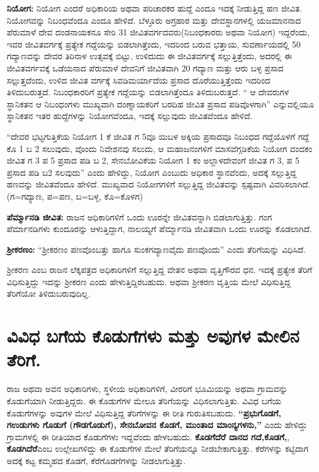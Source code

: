 \textbf{ನಿಯೋಗ: } ನಿಯೋಗ ಎಂದರೆ ಅಧಿಕಾರಿಯ ಅಥವಾ ಪರಿಚಾರಕರ ಹುದ್ದೆ ಎಂದೂ ಇದಕ್ಕೆ ನೀಡುತ್ತಿದ್ದ ಹಣ ಜೀವಿತ. ನಿಯೋಗವನ್ನು ನಿಬಂಧವೆಂದೂ ಎಂದೂ ಹೇಳಿದೆ. ಬೆಳ್ಳೂರು ಅಗ್ರಹಾರ ಮತ್ತು ದೇವಸ್ಥಾನಗಳಲ್ಲಿ ಯಜಮಾನನಾದ ಪೆರುಮಾಳೆ ದೇವ ದಂಡನಾಯಕನೂ ಸೇರಿ 31 ಜೀವಿತವರ್ಗದವರು(ನಿಬಂಧಕಾರರು ಅಥವಾ ನಿಯೋಗ) ಇದ್ದರೆಂದು, ಇವರ ಜೀವಿತವರ್ಗಕ್ಕೆ ಪ್ರತ್ಯೇಕ ಗದ್ದೆಯನ್ನು ಬಿಡಲಾಗಿತ್ತೆಂದು, ಇದರಿಂದ ಬರುವ ಭತ್ತಾಯ, ಸುವರ್ಣಾಯದಲ್ಲಿ 50 ಗದ್ಯಾಣವನ್ನು ದೇವರ ತಿರಿನಾಳ ಉತ್ಸವಕ್ಕೆ ಬಿಟ್ಟು, ಉಳಿದುದು ಈ ಜೀವಿತವರ್ಗಕ್ಕೆ ಸಲ್ಲುತ್ತಿತ್ತೆಂದು, ಅದರಲ್ಲಿ ಈ ಜೀವಿತವರ್ಗವಕ್ಕೆ ಒಡೆಯನಾದ ಪೆರುಮಾಳೆ ದೇವನಿಗೆ ಜೀವಿತವಾಗಿ 20 ಗದ್ಯಾಣ ಮತ್ತು ಆರು ಬಳ್ಳ ಪ್ರಸಾದ ಸಲ್ಲುತ್ತದೆಂದು, ಉಳಿದ ಜೀವಿತ ವರ್ಗಕ್ಕೆ ಸಿವಡಿಮರ್ಯಾದೆಯ ಪ್ರಸಾದ ದೊರೆಯುತ್ತಿತ್ತೆಂದು ಇದರಿಂದ ತಿಳಿದುಬರುತ್ತದೆ. ನಿಬಂಧಕಾರರಿಗೆ ಪ್ರತ್ಯೇಕ ಗದ್ದೆಯನ್ನು ಬಿಡಲಾಗಿತ್ತೆಂದೂ ತಿಳಿದುಬರುತ್ತದೆ. “ ಆ ದೇವರುಗಳ ಸ್ಥಾನಿಕತನ ಆ ನಿಬಂಧಂಗಳು ಮುಖ್ಯವಾಗಿ ದಂಣ್ನಾಯಕರಿಗೆ ಬರದಿಹ ಜೀವಿತ ಪ್ರಸಾದ ಪಡಿವೊಳಗಾಗಿ” ಎನ್ನುವಲ್ಲಿಯೂ ಸ್ಥಾನಿಕತನ ಇತರ ಹುದ್ದೆಗಳನ್ನು ನಿಯೋಗವೆಂದೂ, ಇದಕ್ಕೆ ಸಲ್ಲುವುದು ಜೀವಿತವೆಂದೂ ಹೇಳಿದೆ.

“ದೇವರ ಭಟ್ಟಗುತ್ತಿಕೆಯ ನಿಯೋಗ 1 ಕೆ ಜೀವಿತ ಗ 5ವೂ ಯಿಬಳ ಅಕ್ಕಿಯ ಪ್ರಸಾದವೂ ನಿಬಂಧದ ಗದ್ದೆಯೊಳಗೆ ಗದ್ದೆ ಕೊ 1 ಬ 2 ಸಲುವುದು, ವೊಂದು ನಿವೇಶನವು ಸಲುದು, ಆ ಮಹಾಜನಂಗಳಿಗೆ ಮಾಸವೆಗ್ಗಡಿಕೆಯ ನಿಯೋಗ ವಂದಕಂ ಜೀವಿತ ಗ 3 ಪ 5 ಪ್ರಸಾದ ಪಡಿ ಬ 2, ಸೇನಬೋವಿಕೆಯ ನಿಯೋಗ 1 ಕಂ ಅಲ್ಲಾಳದೇವಂಗೆ ಜೀವಿತ ಗ 3, ಪ 5 ಪ್ರಸಾದ ಪಡಿ ಬ2 ಸಲವುದು” ಎಂದು ಹೇಳಿದ್ದು, ನಿಯೋಗ ಎಂಬುದು ಅಧಿಕಾರ ಸ್ಥಾನವೆಂದು, ಅದಕ್ಕೆ ಸಲ್ಲುತ್ತಿದ್ದ ಹಣವನ್ನು ಜೀವಿತವೆಂದೂ ಹೇಳಿದೆ. ಮುಖ್ಯವಾದ ನಿಯೋಗಗಳಿಗೆ ಸಲ್ಲುತ್ತಿದ್ದ ಜೀವಿತವನ್ನು ಸ್ಪಷ್ಟವಾಗಿ ವಿವರಿಸಲಾಗಿದೆ. (ಗ=ಗದ್ಯಾಣ, ಪ=ಪಣ, ಬ=ಬಳ್ಳ, ಕೊ=ಕೊಳಗ)

\textbf{ಪೆರ್ಮ್ಮಾನಡಿ ಜೀವಿತ: } ರಾಜನ ಅಧಿಕಾರಿಗಳಿಗೆ ಒಂದು ಊರನ್ನೇ ಜೀವಿತವನ್ನಾಗಿ ಬಿಡಲಾಗುತ್ತಿತ್ತು. ಗಂಗ ಪೆರ್ಮಾನಡಿಗಳು ಕುಂದೂರನ್ನು ಆಳುತ್ತಿದ್ದಾಗ, ನಾಲಯ್ಯಗೆ ಪೆರ್ಮ್ಮಾನಡಿ ಜೀವಿತವಾಗಿ ಒಂದು ಊರನ್ನು ಕೊಡಲಾಗಿದೆ.

\textbf{ಶ‍್ರೀಕರಣಂ: }“ಶ‍್ರೀಕರಣಂ ಪಣವೊಂಬತ್ತು ಹಾಗೂ ಸುಂಕಗದ್ಯಾಣವೈದು ಪಣವೊಂದು” ಎಂದು ತೆರಿಗೆಯನ್ನು ವಿಧಿಸಿದೆ.

ಶ‍್ರೀಕರಣ ಎಂಬ ರಾಜನ ಲೆಕ್ಕಪತ್ರದ ಅಧಿಕಾರಿಗಳಿಗೆ ಸಲ್ಲುತ್ತಿದ್ದ ವೇತನ ಅಥವಾ ವೃತ್ತಿಗೌರವ ಧನ. ಇದಕ್ಕೆ ಪ್ರತ್ಯೇಕ ತೆರಿಗೆ ವಿಧಿಸುತ್ತಿದ್ದು ಇದನ್ನು ಶ‍್ರೀಕರಣ ಎಂದು ಹೇಳುತ್ತಿದ್ದಿರಬಹುದು. ಅಥವಾ ಶ‍್ರೀಕರಣ ವೃತ್ತಿಯ ಮೇಲೆ ವಿಧಿಸುತ್ತಿದ್ದ ತೆರಿಗೆಯೋ ತಿಳಿದುಬರುವುದಿಲ್ಲ.


\section{ವಿವಿಧ ಬಗೆಯ ಕೊಡುಗೆಗಳು ಮತ್ತು ಅವುಗಳ ಮೇಲಿನ ತೆರಿಗೆ.}

ರಾಜ ಅಥವಾ ಅವನ ಅಧಿಕಾರಿಗಳು, ಸ್ಥಳೀಯ ಅಧಿಕಾರಿಗಳಿಗೆ, ವೀರರಿಗೆ ಭೂಮಿಯನ್ನು ಅಥವಾ ಗ್ರಾಮವನ್ನು ಕೊಡುಗೆಯಾಗಿ ನೀಡುತ್ತಿದ್ದರು. ಈ ಕೊಡುಗೆಗಳ ಮೇಲೂ ತೆರಿಗೆಯನ್ನು ವಿಧಿಸಲಾಗುತ್ತಿತು. ವಿವಿಧ ಬಗೆಯ ಕೊಡುಗೆಗಳನ್ನು ಅವುಗಳ ಮೇಲೆ ವಿಧಿಸುತ್ತಿದ್ದ ತೆರಿಗೆಗಳನ್ನು ಈ ರೀತಿ ಗುರುತಿಸಬಹುದು. \textbf{“ಪ್ರಭುಗೊಡಗೆ, ಗಉಡುಗಳು ಗೊಡುಗೆ (ಗೌಡಗೊಡುಗೆ), ಸೇನಬೋವನ ಕೊಡಗೆ, ಮುಂತಾದ ಮಾಂನ್ಯಗಳನು,”} ಎಂದು ಹೇಳಿದ್ದು ಗ್ರಾಮಗಳಲ್ಲಿ ಈ ರೀತಿಯಾದ ಕೊಡುಗೆಗಳು ಇದ್ದವೆಂದು ಹೇಳಬಹುದು. \textbf{ಕೊಡಗೆದೆರೆ ದಾನದ ಗದೆ,}\textbf{ಕೊಡಗೆ,}, \textbf{ಕೊಡಗಿದೆರೆ}ಎಂಬ ಉಲ್ಲೇಖಗಳಿದ್ದು ಈ ಕೊಡುಗೆಗಳ ಮೇಲೆ ತೆರಿಗೆಯನ್ನೂ ನೀಡಬೇಕಾಗುತ್ತಿತ್ತು. ಕೆರೆಗಳನ್ನು ಕಟ್ಟಿದಾಗ ಅದಕ್ಕೆ ಕಟ್ಟ ಕಮ್ಮಹದ ಕೊಡಗೆ, ಕೆರೆಗೊಡಗೆಗಳನ್ನು ನೀಡಲಾಗುತ್ತಿತ್ತು.

